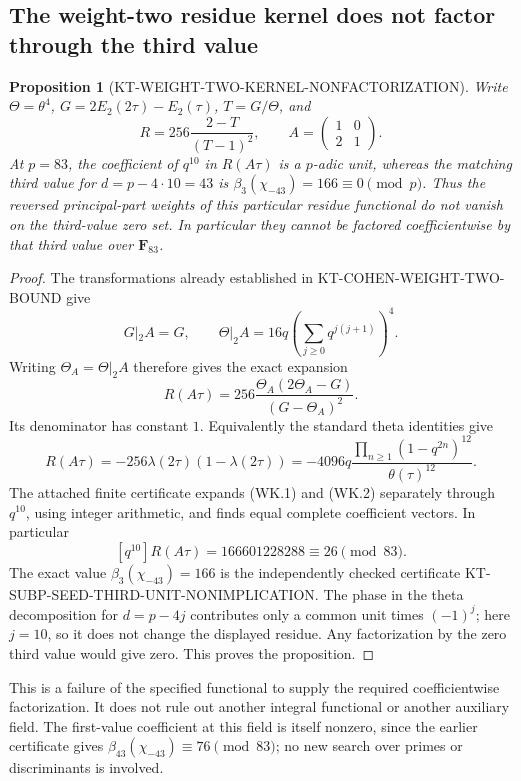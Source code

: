 \documentclass[11pt,a4paper]{article}
\newtheorem{proposition}[theorem]{Proposition}
\theoremstyle{definition}
\begin{document}
\subsection{The weight-two residue kernel does not factor through the third value}

\begin{proposition}[KT-WEIGHT-TWO-KERNEL-NONFACTORIZATION]
Write $\Theta=\theta^4$, $G=2E_2(2\tau)-E_2(\tau)$,
$T=G/\Theta$, and
\[
 R=256\frac{2-T}{(T-1)^2},\qquad
 A=\begin{pmatrix}1&0\\2&1\end{pmatrix}.
\]
At $p=83$, the coefficient of $q^{10}$ in $R(A\tau)$ is a
$p$-adic unit, whereas the matching third value for
$d=p-4\cdot10=43$ is $\beta_3(\chi_{-43})=166\equiv0\pmod p$.
Thus the reversed principal-part weights of this particular residue
functional do not vanish on the third-value zero set.  In particular
they cannot be factored coefficientwise by that third value over
$\mathbf F_{83}$.
\end{proposition}

\begin{proof}
The transformations already established in
KT-COHEN-WEIGHT-TWO-BOUND give
\[
 G|_2A=G,\qquad
 \Theta|_2A=16q\left(\sum_{j\geq0}q^{j(j+1)}\right)^4.
\]
Writing $\Theta_A=\Theta|_2A$ therefore gives the exact expansion
\[
 R(A\tau)=256\frac{\Theta_A(2\Theta_A-G)}{(G-\Theta_A)^2}.
 \tag{WK.1}
\]
Its denominator has constant $1$.  Equivalently the standard theta
identities give
\[
 R(A\tau)=-256\lambda(2\tau)(1-\lambda(2\tau))
   =-4096q\frac{\prod_{n\geq1}(1-q^{2n})^{12}}{\theta(\tau)^{12}}.
 \tag{WK.2}
\]
The attached finite certificate expands (WK.1) and (WK.2) separately
through $q^{10}$, using integer arithmetic, and finds equal complete
coefficient vectors.  In particular
\[
 [q^{10}]R(A\tau)=166601228288\equiv26\pmod{83}.
\]
The exact value $\beta_3(\chi_{-43})=166$ is the independently checked
certificate KT-SUBP-SEED-THIRD-UNIT-NONIMPLICATION.  The phase in the
theta decomposition for $d=p-4j$ contributes only a common unit times
$(-1)^j$; here $j=10$, so it does not change the displayed residue.
Any factorization by the zero third value would give zero.  This
proves the proposition.
\end{proof}

This is a failure of the specified functional to supply the required
coefficientwise factorization.  It does not rule out another integral
functional or another auxiliary field.  The first-value coefficient at
this field is itself nonzero, since the earlier certificate gives
$\beta_{43}(\chi_{-43})\equiv76\pmod{83}$; no new search over primes or
discriminants is involved.
\end{document}

